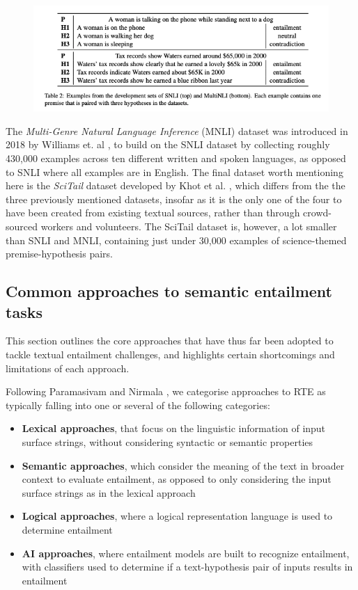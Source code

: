 \documentclass[12pt,twoside]{report}
\begin{document}
\begin{figure}[H]
\centering
\includegraphics[width = 1\hsize]{./figures/SNLI examples.png}
\label{fig:SNLI}
\end{figure}

The \textit{Multi-Genre Natural Language Inference} (MNLI) dataset was introduced in 2018 by Williams et. al \cite{williams-etal-2018-broad}, to build on the SNLI dataset by collecting roughly 430,000 examples across ten different written and spoken languages, as opposed to SNLI where all examples are in English. The final dataset worth mentioning here is the \textit{SciTail} dataset developed by Khot et al. \cite{Khot_Sabharwal_Clark_2018}, which differs from the the three previously mentioned datasets, insofar as it is the only one of the four to have been created from existing textual sources, rather than through crowd-sourced workers and volunteers. The SciTail dataset is, however, a lot smaller than SNLI and MNLI, containing just under 30,000 examples of science-themed premise-hypothesis pairs. \newline \par


\subsection{Common approaches to semantic entailment tasks}

This section outlines the core approaches that have thus far been adopted to tackle textual entailment challenges, and highlights certain shortcomings and limitations of each approach. \newline \par

Following Paramasivam and Nirmala \cite{PARAMASIVAM20229644}, we categorise approaches to RTE as typically falling into one or several of the following categories:
\begin{itemize}
    \item \textbf{Lexical approaches}, that focus on the linguistic information of input surface strings, without considering syntactic or semantic properties
    \item \textbf{Semantic approaches}, which consider the meaning of the text in broader context to evaluate entailment, as opposed to only considering the input surface strings as in the lexical approach
    \item \textbf{Logical approaches}, where a logical representation language is used to determine entailment
    \item \textbf{AI approaches}, where entailment models are built to recognize entailment, with classifiers used to determine if a text-hypothesis pair of inputs results in entailment 
\end{itemize}
\end{document}
